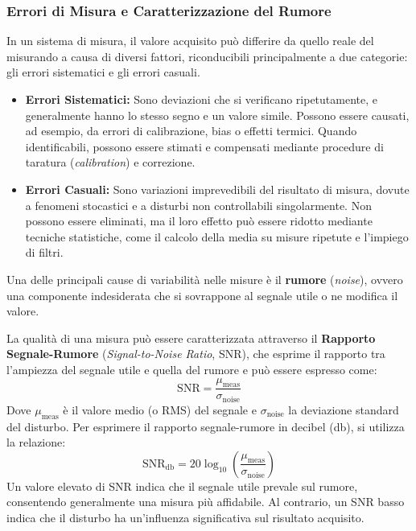 ﻿\documentclass[11pt, a4paper]{article}
\begin{document}
\subsubsection{Errori di Misura e Caratterizzazione del Rumore}

In un sistema di misura, il valore acquisito può differire da quello reale del misurando a causa di diversi fattori, riconducibili principalmente a due categorie: gli errori sistematici e gli errori casuali.

\begin{itemize}
    \item \textbf{Errori Sistematici:} Sono deviazioni che si verificano ripetutamente, e generalmente hanno lo stesso segno e un valore simile. Possono essere causati, ad esempio, da errori di calibrazione, bias o effetti termici. Quando identificabili, possono essere stimati e compensati mediante procedure di taratura (\textit{calibration}) e correzione.

    \item \textbf{Errori Casuali:} Sono variazioni imprevedibili del risultato di misura, dovute a fenomeni stocastici e a disturbi non controllabili singolarmente. Non possono essere eliminati, ma il loro effetto può essere ridotto mediante tecniche statistiche, come il calcolo della media su misure ripetute e l'impiego di filtri.
\end{itemize}

Una delle principali cause di variabilità nelle misure è il \textbf{rumore} (\textit{noise}), ovvero una componente indesiderata che si sovrappone al segnale utile o ne modifica il valore.

La qualità di una misura può essere caratterizzata attraverso il \textbf{Rapporto Segnale-Rumore} (\textit{Signal-to-Noise Ratio}, SNR), che esprime il rapporto tra l'ampiezza del segnale utile e quella del rumore e può essere espresso come:
\[
    \text{SNR} = \frac{\mu_{\text{meas}}}{\sigma_{\text{noise}}}
\]
Dove $\mu_{\text{meas}}$ è il valore medio (o RMS) del segnale e $\sigma_{\text{noise}}$ la deviazione standard del disturbo. Per esprimere il rapporto segnale-rumore in decibel (\si{\decibel}), si utilizza la relazione:
\[
    \text{SNR}_{\si{\decibel}} = 20 \log_{10} \left( \frac{\mu_{\text{meas}}}{\sigma_{\text{noise}}} \right)
\]
Un valore elevato di SNR indica che il segnale utile prevale sul rumore, consentendo generalmente una misura più affidabile. Al contrario, un SNR basso indica che il disturbo ha un'influenza significativa sul risultato acquisito.
\end{document}
